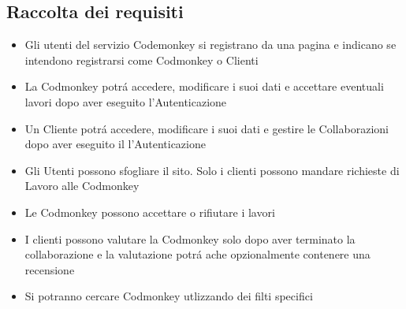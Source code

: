 \subsection {Raccolta dei requisiti}

\begin{itemize}
\large
\item Gli utenti del servizio Codemonkey si registrano da una pagina e indicano se intendono registrarsi come Codmonkey o Clienti
\item La Codmonkey potrá accedere, modificare i suoi dati e accettare eventuali lavori dopo aver eseguito l'Autenticazione
\item Un Cliente potrá accedere, modificare i suoi dati e gestire le Collaborazioni dopo aver eseguito il l'Autenticazione
\item Gli Utenti possono sfogliare il sito. Solo i clienti possono mandare richieste di Lavoro alle Codmonkey
\item Le Codmonkey possono accettare o rifiutare i lavori
\item I clienti possono valutare la Codmonkey solo dopo aver terminato la collaborazione e la valutazione potrá ache opzionalmente contenere una recensione
\item Si potranno cercare Codmonkey utlizzando dei filti specifici
\end{itemize}
